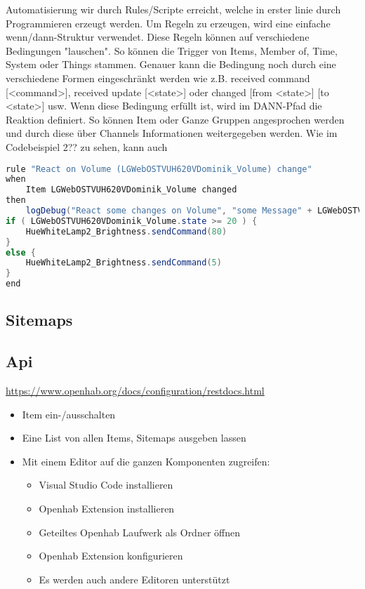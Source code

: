 Automatisierung wir durch Rules/Scripte erreicht, welche in erster linie durch Programmieren erzeugt werden. Um Regeln zu erzeugen, wird eine einfache wenn/dann-Struktur verwendet. Diese Regeln können auf verschiedene Bedingungen "lauschen". So können die Trigger von Items, Member of, Time, System oder Things stammen. Genauer kann die Bedingung noch durch eine verschiedene Formen eingeschränkt werden wie z.B. received command [<command>],  received update [<state>] oder changed [from <state>] [to <state>] usw.
Wenn diese Bedingung erfüllt ist, wird im DANN-Pfad die Reaktion definiert. So können Item oder Ganze Gruppen angesprochen werden und durch diese über Channels Informationen weitergegeben werden.
Wie im Codebeispiel 2?? zu sehen, kann auch 
\begin{lstlisting}[language=java,firstnumber=1,caption=Beispiele Rule Beispiel,label=lst:sample-rule]
rule "React on Volume (LGWebOSTVUH620VDominik_Volume) change"
when
	Item LGWebOSTVUH620VDominik_Volume changed
then
	logDebug("React some changes on Volume", "some Message" + LGWebOSTVUH620VDominik_Volume.state.toString)
if ( LGWebOSTVUH620VDominik_Volume.state >= 20 ) {
	HueWhiteLamp2_Brightness.sendCommand(80)
}
else {
	HueWhiteLamp2_Brightness.sendCommand(5)
}
end
\end{lstlisting}

\subsection{Sitemaps}

\subsection{Api}
\url{https://www.openhab.org/docs/configuration/restdocs.html}
\begin{itemize}
	\item Item ein-/ausschalten
	\item Eine List von allen Items, Sitemaps ausgeben lassen
	\item Mit einem Editor auf die ganzen Komponenten zugreifen:
	\begin{itemize}
		\item Visual Studio Code installieren
		\item Openhab Extension installieren
		\item Geteiltes Openhab Laufwerk als Ordner öffnen
		\item Openhab Extension konfigurieren
		\item Es werden auch andere Editoren unterstützt
	\end{itemize}
\end{itemize}

